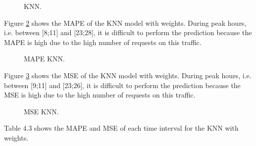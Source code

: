 \pagebreak
 

\begin{figure}[!h]
	\begin{center}
	\end{center}
	\caption{KNN.}
	\label{KNN}
\end{figure}

Figure \ref{MAPE KNN} shows the MAPE of the KNN model with weights. During peak hours, i.e. between [8;11] and [23;28], it is difficult to perform the prediction because the MAPE is high due to the high number of requests on this traffic.

\begin{figure}[!h]
	\begin{center}
	\end{center}
	\caption{MAPE KNN.}
	\label{MAPE KNN}
\end{figure} 

\pagebreak
Figure \ref{MSE KNN} shows the MSE of the KNN model with weights. During peak hours, i.e. between [9;11] and [23;26], it is difficult to perform the prediction because the MSE is high due to the high number of requests on this traffic.
\begin{figure}[!h]
	\begin{center}
	\end{center}
	\caption{MSE KNN.}
	\label{MSE KNN}
\end{figure}

Table 4.3 shows the MAPE and MSE of each time interval for the KNN with weights.

